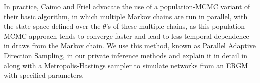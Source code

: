 In practice, Caimo and Friel advocate the use of a population-MCMC variant of their basic algorithm, in which multiple Markov chains are run in parallel, with the state space defined over the $\theta$'s of these multiple chains, as this population MCMC approach tends to converge faster and lead to less temporal dependence in draws from the Markov chain.  We use this method, known as Parallel Adaptive Direction Sampling, in our private inference methods and explain it in detail in  along with a Metropolis-Hastings sampler to simulate networks from an ERGM with specified parameters.




